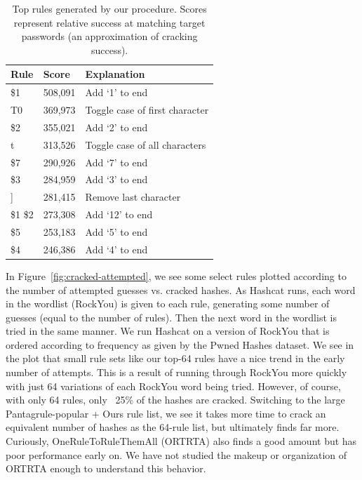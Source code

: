 \documentclass{article}
\begin{document}
\begin{table}
\centering
\begin{tabular}{|l|l|l|}
\hline
Rule & Score & Explanation \\
\hline
\$1 & 508,091 & Add `1' to end \\
T0 & 369,973 & Toggle case of first character \\
\$2 & 355,021 & Add `2' to end \\
t & 313,526 & Toggle case of all characters \\
\$7 & 290,926 & Add `7' to end \\
\$3 & 284,959 & Add `3' to end \\
] & 281,415 & Remove last character \\
\$1 \$2 & 273,308 & Add `12' to end \\
\$5 & 253,183 & Add `5' to end \\
\$4 & 246,386 & Add `4' to end \\
\hline
\end{tabular}
\caption{Top rules generated by our procedure. Scores represent relative
success at matching target passwords (an approximation of cracking success).}
\label{tab:top_rules}
\end{table}

In Figure~\ref{fig:cracked-attempted}, we see some select rules plotted
according to the number of attempted guesses vs. cracked hashes. As Hashcat
runs, each word in the wordlist (RockYou) is given to each rule, generating
some number of guesses (equal to the number of rules). Then the next word in
the wordlist is tried in the same manner. We run Hashcat on a version of
RockYou that is ordered according to frequency as given by the Pwned Hashes
dataset\autocite{pwned}. We see in the plot that small rule sets like our top-64
rules have a nice trend in the early number of attempts. This is a result of
running through RockYou more quickly with just 64 variations of each RockYou
word being tried. However, of course, with only 64 rules, only ~25\% of the
hashes are cracked. Switching to the large Pantagrule-popular + Ours rule list,
we see it takes more time to crack an equivalent number of hashes as the
64-rule list, but ultimately finds far more. Curiously, OneRuleToRuleThemAll
(ORTRTA) also finds a good amount but has poor performance early on. We have
not studied the makeup or organization of ORTRTA enough to understand this
behavior.
\end{document}
